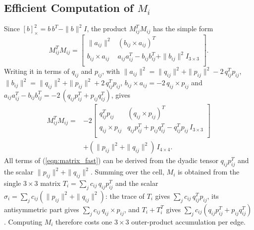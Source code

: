 \documentclass{birkjour}
\theoremstyle{remark}
\numberwithin{equation}{section}
\begin{document}
 \subsection{Efficient Computation of $M_i$}

Since $\left[ b \right]^2_\times = b \, b^T - \| b \|^2 I$, the product $M_{ij}^T M_{ij}$ has the simple form
\begin{equation*}
	M_{ij}^T M_{ij} =
	\left[\begin{array}{cc}
		\| a_{ij} \|^2        &         (b_{ij} \times a_{ij})^T \\
		b_{ij} \times a_{ij}  &    a_{ij} a_{ij}^T - b_{ij} b_{ij}^T + \| b_{ij} \|^2 I_{3\times3} \\
	\end{array}\right].
\end{equation*}
Writing it in terms of $q_{ij}$ and $p_{ij}$, with $\|a_{ij}\|^2 = \|q_{ij}\|^2 + \|p_{ij}\|^2 - 2 \, q_{ij}^T p_{ij}$, $\|b_{ij}\|^2 = \|q_{ij}\|^2 + \|p_{ij}\|^2 + 2 \, q_{ij}^T p_{ij}$, $b_{ij} \times a_{ij} = -2 \, q_{ij} \times p_{ij}$ and $a_{ij} a_{ij}^T - b_{ij} b_{ij}^T = -2 \, (q_{ij} p_{ij}^T + p_{ij} q_{ij}^T)$, gives
\begin{equation}
   \label{eqn:matrix_fast}
   \begin{aligned}
   	M_{ij}^T M_{ij}
   	= {} & -2
	\left[\begin{array}{cc}
		q_{ij}^T p_{ij}       &         (q_{ij} \times p_{ij})^T \\
		q_{ij} \times p_{ij}  &    q_{ij} p_{ij}^T + p_{ij} q_{ij}^T - q_{ij}^T p_{ij} \, I_{3\times3} \\
	\end{array}\right] \\
    & + (\| p_{ij} \|^2 + \| q_{ij} \|^2) \, I_{4\times4}.
   \end{aligned}
\end{equation}
All terms of (\ref{eqn:matrix_fast}) can be derived from the dyadic tensor $q_{ij} p_{ij}^T$ and the scalar $\|p_{ij}\|^2 + \|q_{ij}\|^2$. Summing over the cell, $M_i$ is obtained from the single $3 \times 3$ matrix $T_i = \sum_j c_{ij} \, q_{ij} p_{ij}^T$ and the scalar $\sigma_i = \sum_j c_{ij} (\|p_{ij}\|^2 + \|q_{ij}\|^2)$: the trace of $T_i$ gives $\sum_j c_{ij} \, q_{ij}^T p_{ij}$, its antisymmetric part gives $\sum_j c_{ij} \, q_{ij} \times p_{ij}$, and $T_i + T_i^T$ gives $\sum_j c_{ij} (q_{ij} p_{ij}^T + p_{ij} q_{ij}^T)$. Computing $M_i$ therefore costs one $3 \times 3$ outer-product accumulation per edge.
\end{document}
